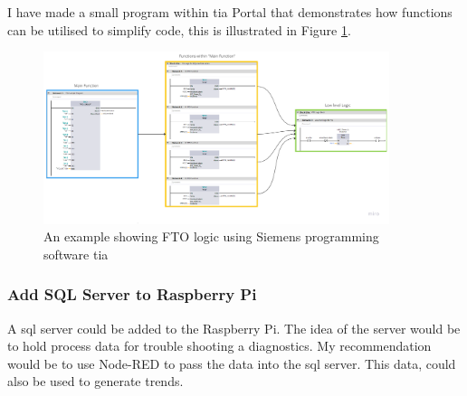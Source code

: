             I have made a small program within \acrshort{tia} Portal that demonstrates how functions can be utilised to simplify code, this is illustrated in  Figure \ref{fig:ftoFunTia}.
    
            \begin{figure}[H]
                \centering
                \includegraphics[width = 0.9\textwidth]{2_images/ftoFunTia}
                \caption{An example showing FTO logic using Siemens programming software \acrfull{tia}}
                \label{fig:ftoFunTia}
            \end{figure}
    
        \subsubsection{Add SQL Server to Raspberry Pi}
            A \acrshort{sql} server could be added to the Raspberry Pi. The idea of the server would be to hold process data for trouble shooting a diagnostics. My recommendation would be to use Node-RED to pass the data into the \acrshort{sql} server. This data, could also be used to generate trends. 


